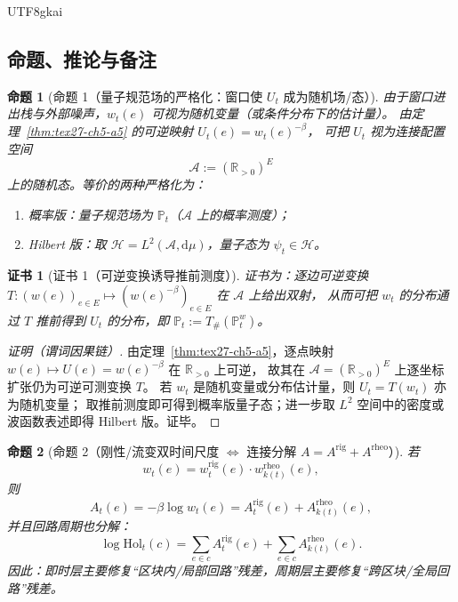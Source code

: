\documentclass[12pt]{article}
\newtheorem{proposition}{命题}[section]
\newtheorem{Certificate}{证书}[section]
\newcommand{\RR}{\mathbb{R}}
\begin{document}
\begin{CJK*}{UTF8}{gkai}
\subsection{命题、推论与备注}
\label{subsec:tex27-ch5-others}

\begin{proposition}[命题 1（量子规范场的严格化：窗口使 $U_t$ 成为随机场/态）]
\label{prop:tex27-ch5-p1}
由于窗口进出栈与外部噪声，$w_t(e)$ 可视为随机变量（或条件分布下的估计量）。
由定理~\ref{thm:tex27-ch5-a5} 的可逆映射 $U_t(e)=w_t(e)^{-\beta}$，
可把 $U_t$ 视为连接配置空间
\[
  \mathcal{A}:=(\RR_{>0})^{E}
\]
上的随机态。等价的两种严格化为：
\begin{enumerate}
  \item 概率版：量子规范场为 $\mathbb{P}_t$（$\mathcal{A}$ 上的概率测度）；
  \item Hilbert 版：取 $\mathcal{H}=L^2(\mathcal{A},\mathrm{d}\mu)$，量子态为 $\psi_t\in\mathcal{H}$。
\end{enumerate}
\end{proposition}

\begin{Certificate}[证书 1（可逆变换诱导推前测度）]
\label{cert:tex27-ch5-p1}
证书为：逐边可逆变换 $T:(w(e))_{e\in E}\mapsto (w(e)^{-\beta})_{e\in E}$ 在 $\mathcal{A}$ 上给出双射，
从而可把 $w_t$ 的分布通过 $T$ 推前得到 $U_t$ 的分布，即 $\mathbb{P}_t:=T_\#(\mathbb{P}^w_t)$。
\end{Certificate}

\begin{proof}[证明（谓词因果链）]
由定理~\ref{thm:tex27-ch5-a5}，逐点映射 $w(e)\mapsto U(e)=w(e)^{-\beta}$ 在 $\RR_{>0}$ 上可逆，
故其在 $\mathcal{A}=(\RR_{>0})^{E}$ 上逐坐标扩张仍为可逆可测变换 $T$。
若 $w_t$ 是随机变量或分布估计量，则 $U_t=T(w_t)$ 亦为随机变量；
取推前测度即可得到概率版量子态；进一步取 $L^2$ 空间中的密度或波函数表述即得 Hilbert 版。证毕。
\end{proof}

\begin{proposition}[命题 2（刚性/流变双时间尺度 $\Leftrightarrow$ 连接分解 $A=A^{\mathrm{rig}}+A^{\mathrm{rheo}}$）]
\label{prop:tex27-ch5-p2}
若
\[
  w_t(e)=w^{\mathrm{rig}}_t(e)\cdot w^{\mathrm{rheo}}_{k(t)}(e),
\]
则
\[
  A_t(e)=-\beta\log w_t(e)=A^{\mathrm{rig}}_t(e)+A^{\mathrm{rheo}}_{k(t)}(e),
\]
并且回路周期也分解：
\[
  \log\mathrm{Hol}_t(c)=\sum_{e\in c}A^{\mathrm{rig}}_t(e)+\sum_{e\in c}A^{\mathrm{rheo}}_{k(t)}(e).
\]
因此：即时层主要修复“区块内/局部回路”残差，周期层主要修复“跨区块/全局回路”残差。
\end{proposition}


\end{CJK*}
\end{document}
